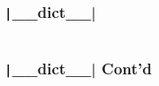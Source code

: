 \documentclass{../py-lecture}
\begin{document}
\begin{frame}[fragile]
  \frametitle{\texttt|__dict__|}
  \inputminted[bgcolor=Black,fontsize=\scriptsize,lastline=20]{python}{./src/borg.py}
\end{frame}

\begin{frame}[fragile]
  \frametitle{\texttt|__dict__| Cont'd}
  \inputminted[bgcolor=Black,fontsize=\scriptsize,firstline=22]{python}{./src/borg.py}
\end{frame}
\end{document}
